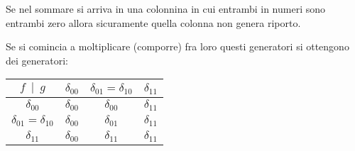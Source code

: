 \documentclass[a4paper,portrait,12pt]{article}
\theoremstyle{definition}
\begin{document}
Se nel sommare si arriva in una colonnina in cui entrambi in numeri sono entrambi zero allora sicuramente quella colonna non genera riporto.

Se si comincia a moltiplicare (comporre) fra loro questi generatori si ottengono dei generatori:

\begin{center}
\begin{tabular}{c|c c c}
$f\ \mid \ g$ & $\delta_{00}$ & $\delta_{01} = \delta_{10}$ & $\delta_{11}$ \\ \hline
$\delta_{00}$ & $\delta_{00}$ & $\delta_{00}$ & $\delta_{11}$ \\
$\delta_{01} = \delta_{10}$ & $\delta_{00}$ & $\delta_{01}$ & $\delta_{11}$ \\
$\delta_{11}$ & $\delta_{00}$ & $\delta_{11}$ & $\delta_{11}$ \\
\end{tabular}
\end{center}
\end{document}
